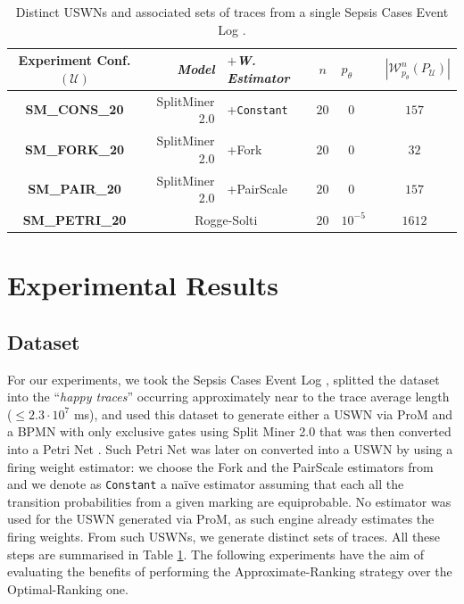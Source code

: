 \begin{table}[!t]
\caption{Distinct USWNs and associated sets of \unravelled traces from a single Sepsis Cases Event Log \cite{mannhardt_2016}.}\label{tab:dataset}
 \begin{adjustbox}{max width=\textwidth}
	\begin{tabular}{crl||cl|c}
		\toprule
		\textbf{Experiment Conf.} $(\mathcal{U})$ & \textit{Model} & $+$\textit{W. Estimator} & $n$ & $p_\theta$& $\;\;|\mathcal{W}_{p_\theta}^n(P_{\mathcal{U}})|$ \\
		\midrule
		
		\textbf{SM\_CONS\_20} &SplitMiner 2.0  \cite{AugustoCDRP19}       & +\texttt{Constant} & $20$ & $\;\;0$ & $157$  \\
		
		\textbf{SM\_FORK\_20} & SplitMiner 2.0  \cite{AugustoCDRP19}      & +Fork \cite{spdwe} & $20$ & $\;\;0$ & $32$  \\
		
		
		\textbf{SM\_PAIR\_20} & SplitMiner 2.0  \cite{AugustoCDRP19}      & +PairScale \cite{spdwe} & $20$ & $\;\;0$ & $157$ \\
		
		\textbf{SM\_PETRI\_20} & \multicolumn{2}{c||}{Rogge-Solti \cite{RoggeSoltiAW13}} & $20$ & $10^{-5}$ & $1612$ \\
		\bottomrule
	\end{tabular}
\end{adjustbox}
\end{table}
\section{Experimental Results}\label{sec:exp}
\subsection{Dataset}
For our experiments, we took the Sepsis Cases Event Log \cite{mannhardt_2016}, splitted the dataset into the ``\textit{happy traces}'' occurring approximately near to the trace average length ($\leq 2.3\cdot 10^{7}$ ms), and used this dataset to generate either a USWN via ProM \cite{RoggeSoltiAW13} and a BPMN with only exclusive gates using Split Miner 2.0 \cite{AugustoCDRP19} that was then converted into a Petri Net \cite{PPNFromLog}. Such Petri Net was later on converted into a USWN by using a firing weight estimator: we choose the Fork and the PairScale estimators from \cite{spdwe} and we denote as \texttt{Constant} a naïve estimator assuming that each all the transition probabilities from a given marking are equiprobable. No estimator was used for the USWN generated via ProM, as such engine already estimates the firing weights. From such USWNs, we generate distinct sets of \unravelled traces. All these steps are summarised in Table \ref{tab:dataset}. The following experiments have the aim of evaluating the benefits of performing the Approximate-Ranking strategy over the Optimal-Ranking one.

